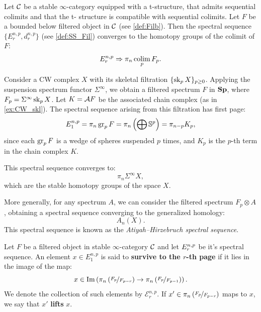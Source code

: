 \begin{thm}{\cite[Prop.\ 1.2.2.14]{Lur17}}\label{th:converge}
    Let $\mathcal{C}$ be a stable $\infty$-category equipped with a t-structure, that admits sequential colimits and that the t-
    structure is compatible with sequential colimits. Let $F$ be a bounded below filtered object in $\mathcal{C}$ (see \cref{def:Filb}). Then the spectral sequence $\{ E_r^{n,p}, d_r^{n,p} \}$ (see \cref{def:SS_Fil}) converges to the homotopy groups of the colimit of $F$:
    \begin{equation*}
        E_r^{n,p} \Rightarrow \pi_n \operatorname*{colim}_p F_p.
    \end{equation*}
\end{thm}

\begin{exmp}\label{ex:CW_pages}
    Consider a CW complex $X$ with its skeletal filtration $\{ \operatorname{sk}_p X \}_{p \geq 0}$. Applying the suspension spectrum functor $\Sigma^\infty$, we obtain a filtered spectrum $F$ in $\mathbf{Sp}$, where $F_p = \Sigma^\infty \operatorname{sk}_p X$. Let $K = \mathcal{A} F$ be the associated chain complex (as in \cref{ex:CW_skl}). The spectral sequence arising from this filtration has first page:
    \begin{equation*}
        E_1^{n,p} = \pi_n \operatorname{gr}_p F = \pi_n \left( \bigoplus \mathbb{S}^p \right) = \pi_{n - p} K_p,
    \end{equation*}
    since each $\operatorname{gr}_p F$ is a wedge of spheres suspended $p$ times, and $K_p$ is the $p$-th term in the chain complex $K$.

    This spectral sequence converges to:
    \begin{equation*}
        \pi_n \Sigma^\infty X,
    \end{equation*}
    which are the stable homotopy groups of the space $X$.

    More generally, for any spectrum $A$, we can consider the filtered spectrum $F_p \otimes A$, obtaining a spectral sequence converging to the generalized homology:
    \begin{equation*}
        A_n(X).
    \end{equation*}
    This spectral sequence is known as the \emph{Atiyah--Hirzebruch spectral sequence}.
\end{exmp}

\begin{defn}\label{def:survive}
    Let $F$ be a filtered object in stable $\infty$-category $\mathcal{C}$ and let $E_r^{n,p}$ be it's spectral sequence. An element $x \in E_1^{n,p}$ is said to \textbf{survive to the $r$-th page} if it lies in the image of the map:
    \begin{equation*}
        x \in \operatorname{Im} \left( \pi_n\left( \nicefrac{F_p}{F_{p - r}} \right) \to \pi_n\left( \nicefrac{F_p}{F_{p - 1}} \right) \right).
    \end{equation*}
    We denote the collection of such elements by $\mathcal{E}_r^{n,p}$. If $x' \in \pi_n\left( \nicefrac{F_p}{F_{p - r}} \right)$ maps to $x$, we say that $x'$ \textbf{lifts} $x$.
\end{defn}

